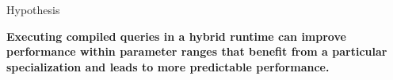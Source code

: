 \begin{block}{Hypothesis}
\begin{overviewbox}
    \textbf{Executing compiled queries in a hybrid runtime can improve performance within parameter ranges that benefit from a particular specialization and leads to more predictable performance.}
\end{overviewbox}
  
\end{block}

